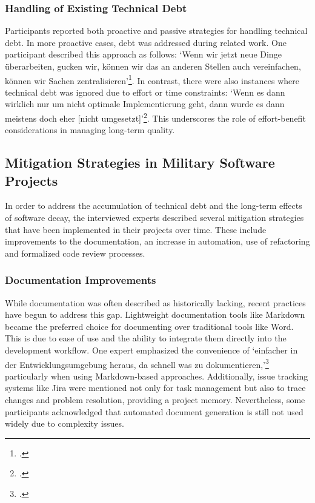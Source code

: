 \subsubsection{Handling of Existing Technical Debt}
Participants reported both proactive and passive strategies for handling technical debt. In more proactive cases, debt was addressed during related work. One participant described this approach as follows: `Wenn wir jetzt neue Dinge überarbeiten, gucken wir, können wir das an anderen Stellen auch vereinfachen, können wir Sachen zentralisieren'\footcite{Interview32025}.
In contrast, there were also instances where technical debt was ignored due to effort or time constraints: `Wenn es dann wirklich nur um nicht optimale Implementierung geht, dann wurde es dann meistens doch eher [nicht umgesetzt]'\footcite{Interview22025}.
This underscores the role of effort-benefit considerations in managing long-term quality.

\subsection{Mitigation Strategies in Military Software Projects}
In order to address the accumulation of technical debt and the long-term effects of software decay, the interviewed experts described several mitigation strategies that have been implemented in their projects over time. These include improvements to the documentation, an increase in automation,
use of refactoring and formalized code review processes.

\subsubsection{Documentation Improvements}
While documentation was often described as historically lacking, recent practices have begun to address this gap. Lightweight documentation tools like Markdown became the preferred choice for documenting over traditional tools like Word. This is due to ease of use and the ability to integrate 
them directly into the development workflow. One expert emphasized the convenience of `einfacher in der Entwicklungsumgebung heraus, da schnell was zu dokumentieren,'\footcite{Interview32025} particularly when using Markdown-based approaches. Additionally, issue tracking systems like Jira were mentioned not only for task management
but also to trace changes and problem resolution, providing a project memory. Nevertheless, some participants acknowledged that automated document generation is still not used widely due to complexity issues.

